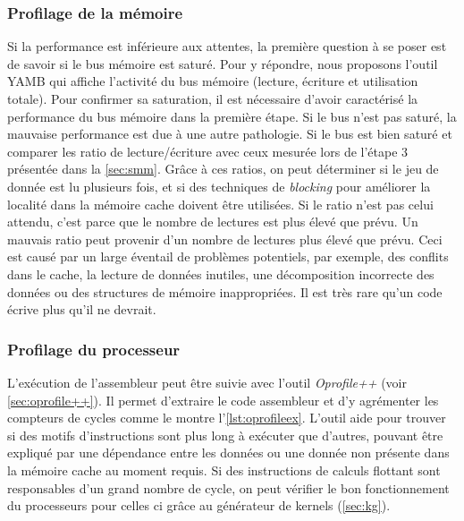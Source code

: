 \subsubsection{Profilage de la mémoire}
Si la performance est inférieure aux attentes, la première question à se poser est de savoir si le bus mémoire est saturé. Pour y répondre, nous proposons l'outil YAMB qui affiche l'activité du bus mémoire (lecture, écriture et utilisation totale). Pour confirmer sa saturation, il est nécessaire d'avoir caractérisé la performance du bus mémoire dans la première étape. Si le bus n'est pas saturé, la mauvaise performance est due à une autre pathologie. Si le bus est bien saturé et comparer les ratio de lecture/écriture avec ceux mesurée lors de l'étape 3 présentée dans la \autoref{sec:smm}. Grâce à ces ratios, on peut déterminer si le jeu de donnée est lu plusieurs fois, et si des techniques de \textit{blocking} pour améliorer la localité dans la mémoire cache doivent être utilisées. Si le ratio n'est pas celui attendu, c'est parce que le nombre de lectures est plus élevé que prévu. Un mauvais ratio peut provenir d'un nombre de lectures plus élevé que prévu. Ceci est causé par un large éventail de problèmes potentiels, par exemple, des conflits dans le cache, la lecture de données inutiles, une décomposition incorrecte des données ou des structures de mémoire inappropriées. Il est très rare qu'un code écrive plus qu'il ne devrait.





\subsubsection{Profilage du processeur}
L'exécution de l'assembleur peut être suivie avec l'outil \textit{Oprofile++} (voir \autoref{sec:oprofile++}). Il permet d'extraire le code assembleur et d'y agrémenter les compteurs de cycles comme le montre l'\autoref{lst:oprofileex}. L'outil aide pour trouver si des motifs d'instructions sont plus long à exécuter que d'autres, pouvant être expliqué par une dépendance entre les données ou une donnée non présente dans la mémoire cache au moment requis. 
Si des instructions de calculs flottant sont responsables d'un grand nombre de cycle, on peut vérifier le bon fonctionnement du processeurs pour celles ci grâce au générateur de kernels (\autoref{sec:kg}). 


